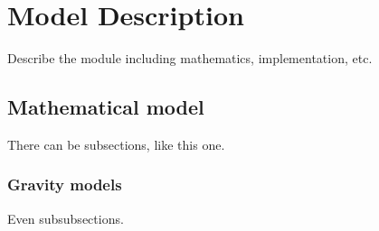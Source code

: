 \section{Model Description}

Describe the module including mathematics, implementation, etc.

\subsection{Mathematical model}
There can be subsections, like this one.

\subsubsection{Gravity models}
Even subsubsections. 